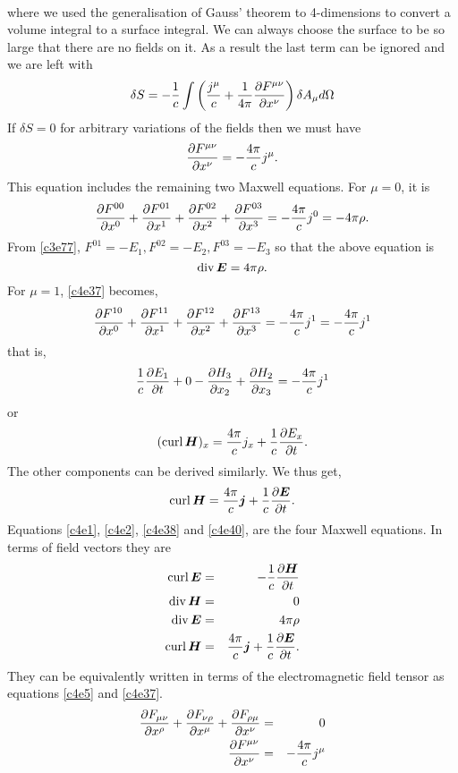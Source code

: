 \begin{enumerate}
\begin{eqnarray}
\end{eqnarray}
where we used the generalisation of Gauss' theorem to 4-dimensions to convert a
volume integral to a surface integral. We can always choose the surface to be so
large that there are no fields on it. As a result the last term can be ignored
and we are left with
\begin{equation}\label{c4e36}
\delta S = -\frac{1}{c}\int\left(\frac{j^\mu}{c} +
 \frac{1}{4\pi}\frac{\partial{F^{\mu\nu}}}{\partial{x^\nu}}\right)\delta A_\mu d\Omega
\end{equation}
If $\delta S = 0$ for arbitrary variations of the fields then we must have
\begin{equation}\label{c4e37}
\frac{\partial{F^{\mu\nu}}}{\partial{x^\nu}} = -\frac{4\pi}{c}j^\mu.
\end{equation}
This equation includes the remaining two Maxwell equations. For $\mu=0$, it is
\[
\frac{\partial{F^{00}}}{\partial{x^0}} + \frac{\partial{F^{01}}}{\partial{x^1}} + \frac{\partial{F^{02}}}{\partial{x^2}} + \frac{\partial{F^{03}}}{\partial{x^3}}
= -\frac{4\pi}{c}j^0 = -4\pi\rho.
\]
From \eqref{c3e77}, $F^{01} = -E_1, F^{02} = -E_2, F^{03} = -E_3$ so that the
above equation is
\begin{equation}\label{c4e38}
\operatorname{div}\bm{E} = 4\pi\rho.
\end{equation}
For $\mu = 1$, \eqref{c4e37} becomes,
\[
\frac{\partial{F^{10}}}{\partial{x^0}} + \frac{\partial{F^{11}}}{\partial{x^1}} + \frac{\partial{F^{12}}}{\partial{x^2}} + \frac{\partial{F^{13}}}{\partial{x^3}}
= -\frac{4\pi}{c}j^1 = -\frac{4\pi}{c}j^1
\]
that is,
\[
\frac{1}{c}\frac{\partial{E_1}}{\partial{t}} + 0 - \frac{\partial{H_3}}{\partial{x_2}} + \frac{\partial{H_2}}{\partial{x_3}} = -\frac{4\pi}{c}j^1
\]
or
\begin{equation}\label{c4e39}
(\operatorname{curl}\bm{H})_x = \frac{4\pi}{c}j_x + \frac{1}{c}\frac{\partial{E_x}}{\partial{t}}.
\end{equation}
The other components can be derived similarly. We thus get,
\begin{equation}\label{c4e40}
\operatorname{curl}\bm{H} = \frac{4\pi}{c}\bm{j} + \frac{1}{c}\frac{\partial{\bm{E}}}{\partial{t}}.
\end{equation}
Equations \eqref{c4e1}, \eqref{c4e2}, \eqref{c4e38} and \eqref{c4e40}, are the
four Maxwell equations. In terms of field vectors they are
\begin{eqnarray*}
\operatorname{curl}\bm{E} &=& -\frac{1}{c}\frac{\partial{\bm{H}}}{\partial{t}} \\
\operatorname{div}\bm{H} &=& 0 \\
\operatorname{div}\bm{E} &=& 4\pi\rho \\
\operatorname{curl}\bm{H} &=& \frac{4\pi}{c}\bm{j} + \frac{1}{c}\frac{\partial{\bm{E}}}{\partial{t}}.
\end{eqnarray*}
They can be equivalently written in terms of the electromagnetic field tensor as
equations \eqref{c4e5} and \eqref{c4e37}.
\begin{eqnarray*}
\frac{\partial{F_{\mu\nu}}}{\partial{x^\rho}} + \frac{\partial{F_{\nu\rho}}}{\partial{x^\mu}} + \frac{\partial{F_{\rho\mu}}}{\partial{x^\nu}} &=& 0 \\
\frac{\partial{F^{\mu\nu}}}{\partial{x^\nu}} &=& -\frac{4\pi}{c}j^\mu
\end{eqnarray*}


\end{enumerate}

